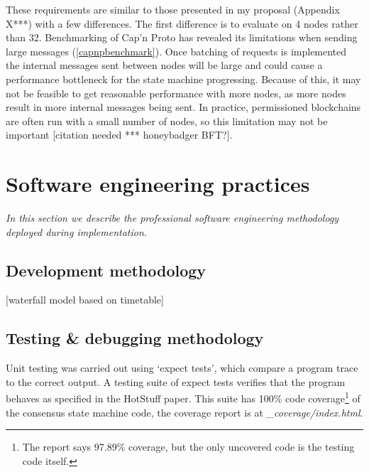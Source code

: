 These requirements are similar to those presented in my proposal (Appendix X***) with a few differences. The first difference is to evaluate on 4 nodes rather than 32. Benchmarking of Cap'n Proto has revealed its limitations when sending large messages (\ref{capnpbenchmark}). Once batching of requests is implemented the internal messages sent between nodes will be large and could cause a performance bottleneck for the state machine progressing. Because of this, it may not be feasible to get reasonable performance with more nodes, as more nodes result in more internal messages being sent. In practice, permissioned blockchains are often run with a small number of nodes, so this limitation may not be important [citation needed *** honeybadger BFT?].


\section{Software engineering practices} \label{softwareeng}

\textit{In this section we describe the professional software engineering methodology deployed during implementation.}

\subsection{Development methodology}
[waterfall model based on timetable]
\subsection{Testing \& debugging methodology} \label{testing}
Unit testing was carried out using `expect tests', which compare a program trace to the correct output. A testing suite of expect tests verifies that the program behaves as specified in the HotStuff paper. This suite has 100\% code coverage\footnote{The report says 97.89\% coverage, but the only uncovered code is the testing code itself.} of the consensus state machine code, the coverage report is at \textit{\_coverage/index.html}.

